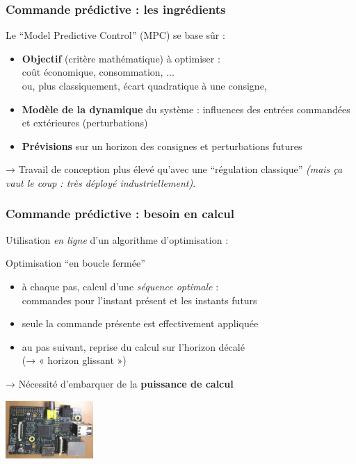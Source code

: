 \begin{frame}
  \frametitle{Commande prédictive : les ingrédients}
  
  Le ``Model Predictive Control'' (MPC) se base sûr :
  \begin{itemize}
   \item \textbf{Objectif} (critère mathématique) à optimiser : \\
   coût économique, consommation, ...\\
   ou, plus classiquement, écart quadratique à une consigne,
   \item \textbf{Modèle de la dynamique} du système : influences des entrées commandées et extérieures (perturbations)
   \item \textbf{Prévisions} sur un horizon des consignes et perturbations futures
  \end{itemize}
  
  \bigskip \pause
  → Travail de conception plus élevé qu'avec une ``régulation classique''
 \emph{ (mais ça vaut le coup : très déployé industriellement)}.

\end{frame}

\begin{frame}
  \frametitle{Commande prédictive : besoin en calcul}
  
  Utilisation \emph{en ligne} d'un algorithme d'optimisation :
  
  \begin{block}{Optimisation ``en boucle fermée''}
  \begin{itemize}
   \item à chaque pas, calcul d’une \emph{séquence optimale} : \\
   commandes pour l’instant présent et les instants futurs
   \item seule la commande présente est effectivement appliquée
   \item au pas suivant, reprise du calcul sur l’horizon décalé \\(→ « horizon glissant »)
  \end{itemize}
  \end{block}
  
  \bigskip \pause
  → Nécessité d'embarquer de la \textbf{puissance de calcul}\\ \pause
  
  \begin{center}
    \includegraphics[width=0.25\textwidth]{figures/RPi_2013_02.jpg}
  \end{center}

\end{frame}

